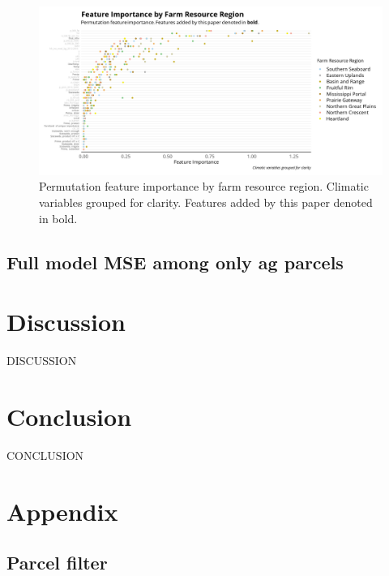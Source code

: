 \documentclass[12pt]{article}
\begin{document}
\begin{figure}
    \centering
    \includegraphics[width=1\textwidth]{exhibits/ffb_importance_all.png}
    \caption{Permutation feature importance by farm resource region. Climatic variables grouped for clarity. Features added by this paper denoted in bold.}
    \label{fig:ffb_importance_all}
\end{figure}



\subsection{Full model MSE among only ag parcels}


\section{Discussion}

DISCUSSION

\newpage

\section{Conclusion}

CONCLUSION

\newpage

\section{Appendix}


\subsection{Parcel filter}
\end{document}
